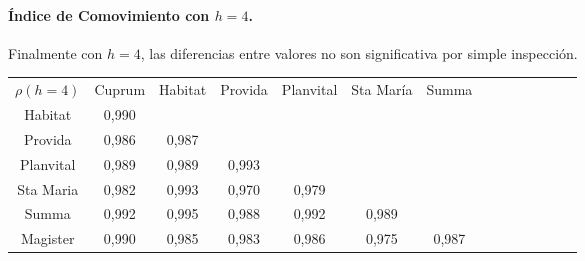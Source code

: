 \paragraph{\'Indice de Comovimiento con $h=4$.}

 Finalmente con $h=4$, las diferencias entre valores no son significativa por simple inspecci\'on.

\begin{center}
\begin{small}
\begin{tabular}{|l|l|l|l|l|l|l|lllllll}
\cline{1-7}
\multicolumn{1}{|c|}{$\rho(h=4)$} & \multicolumn{1}{c|}{Cuprum} & \multicolumn{1}{c|}{Habitat} & \multicolumn{1}{c|}{Provida} & \multicolumn{1}{c|}{Planvital} & \multicolumn{1}{c|}{Sta Mar\'ia} & \multicolumn{1}{c|}{Summa} &  &  &  &  &  &  &  \\
\cline{1-7}
\multicolumn{1}{|c|}{Habitat} & \multicolumn{1}{c|}{0,990} & \multicolumn{1}{c|}{} & \multicolumn{1}{c|}{} & \multicolumn{1}{c|}{} & \multicolumn{1}{c|}{} & \multicolumn{1}{c|}{} &  &  &  &  &  &  &  \\
\cline{1-7}
\multicolumn{1}{|c|}{Provida} & \multicolumn{1}{c|}{0,986} & \multicolumn{1}{c|}{0,987} & \multicolumn{1}{c|}{} & \multicolumn{1}{c|}{} & \multicolumn{1}{c|}{} & \multicolumn{1}{c|}{} &  &  &  &  &  &  &  \\
\cline{1-7}
\multicolumn{1}{|c|}{Planvital} & \multicolumn{1}{c|}{0,989} & \multicolumn{1}{c|}{0,989} & \multicolumn{1}{c|}{0,993} & \multicolumn{1}{c|}{} & \multicolumn{1}{c|}{} & \multicolumn{1}{c|}{} &  &  &  &  &  &  &  \\
\cline{1-7}
\multicolumn{1}{|c|}{Sta Maria} & \multicolumn{1}{c|}{0,982} & \multicolumn{1}{c|}{0,993} & \multicolumn{1}{c|}{0,970} & \multicolumn{1}{c|}{0,979} & \multicolumn{1}{c|}{} & \multicolumn{1}{c|}{} &  &  &  &  &  &  &  \\
\cline{1-7}
\multicolumn{1}{|c|}{Summa} & \multicolumn{1}{c|}{0,992} & \multicolumn{1}{c|}{0,995} & \multicolumn{1}{c|}{0,988} & \multicolumn{1}{c|}{0,992} & \multicolumn{1}{c|}{0,989} & \multicolumn{1}{c|}{} &  &  &  &  &  &  &  \\
\cline{1-7}
\multicolumn{1}{|c|}{Magister} & \multicolumn{1}{c|}{0,990} & \multicolumn{1}{c|}{0,985} & \multicolumn{1}{c|}{0,983} & \multicolumn{1}{c|}{0,986} & \multicolumn{1}{c|}{0,975} & \multicolumn{1}{c|}{0,987} &  &  &  &  &  &  &  \\
\cline{1-7}
\end{tabular}
\end{small}
\end{center}

